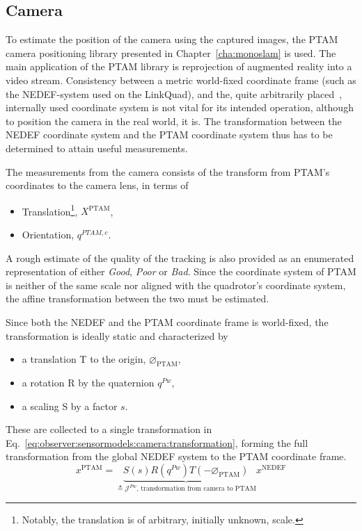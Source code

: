 \subsection{Camera}
\label{ssec:observer:sensormodels:camera}
    To estimate the position of the camera using the captured images,
    the PTAM camera positioning library presented in Chapter~\ref{cha:monoslam} is used.
    The main application of the PTAM library is reprojection of
    augmented reality into a video stream.
    Consistency between a metric world-fixed coordinate frame
    (such as the NEDEF-system used on the LinkQuad), and the, quite arbitrarily placed~\citep{klein07parallel},
    internally used coordinate system is not vital for its intended operation,
    although to position the camera in the real world, it is.
    The transformation between the NEDEF coordinate system and the
    PTAM coordinate system thus has to be determined to attain useful measurements.

    The measurements from the camera consists of the transform from PTAM's coordinates
    to the camera lens, in terms of
    \begin{itemize}
        \item Translation\footnote{Notably, the translation is of arbitrary, initially unknown, scale.}, $X^{\text{PTAM}}$,
        \item Orientation, $q^{PTAM,c}$.
    \end{itemize}
    A rough estimate of the quality of the tracking is also provided as an enumerated representation of either \textit{Good}, \textit{Poor} or \textit{Bad}.
    Since the coordinate system of PTAM is neither of the same scale nor aligned with the quadrotor's coordinate system,
    the affine transformation between the two must be estimated.

    Since both the NEDEF and the PTAM coordinate frame is world-fixed,
    the transformation is ideally static and characterized by
    \begin{itemize}
        \item a translation T to the origin, $\varnothing_{\text{PTAM}}$,
        \item a rotation R by the quaternion $q^{Pw}$,
        \item a scaling S by a factor $s$.
    \end{itemize}
    These are collected to a single transformation in Eq.~\eqref{eq:observer:sensormodels:camera:transformation},
    forming the full transformation from the global NEDEF system to the
    PTAM coordinate frame.
    \begin{equation}
        \label{eq:observer:sensormodels:camera:transformation}
        x^{\text{PTAM}} = \underbrace{S(s) R(q^{Pw}) T(-\varnothing_{\text{PTAM}})}_{\triangleq \mathcal{J}^{Pw}\text{, transformation from camera to PTAM}}
         x^{\text{NEDEF}}
    \end{equation}

